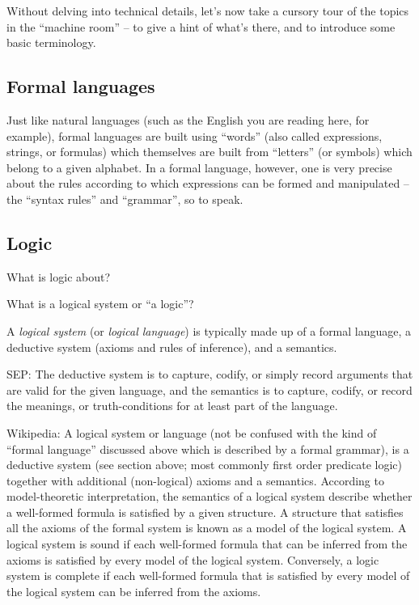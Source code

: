 Without delving into technical details, let's now take a cursory tour of the topics in the ``machine room'' -- to give a hint of what's there, and to introduce some basic terminology.

\subsection{Formal languages}

Just like natural languages (such as the English you are reading here, for example), formal languages are built using ``words'' (also called expressions, strings, or formulas) which themselves are built from ``letters'' (or symbols) which belong to a given alphabet.
In a formal language, however, one is very precise about the rules according to which expressions can be formed and manipulated -- the ``syntax rules'' and ``grammar'', so to speak.


\subsection{Logic}

What is logic about?

What is a logical system or ``a logic''?

A \emph{logical system} (or \emph{logical language}) is typically made up of a formal language, a deductive system (axioms and rules of inference), and a semantics.

SEP: The deductive system is to capture, codify, or simply record arguments that are valid for the given language, and the semantics is to capture, codify, or record the meanings, or truth-conditions for at least part of the language.

Wikipedia: A logical system or language (not be confused with the kind of ``formal language'' discussed above which is described by a formal grammar), is a deductive system (see section above; most commonly first order predicate logic) together with additional (non-logical) axioms and a semantics.
According to model-theoretic interpretation, the semantics of a logical system describe whether a well-formed formula is satisfied by a given structure.
A structure that satisfies all the axioms of the formal system is known as a model of the logical system.
A logical system is sound if each well-formed formula that can be inferred from the axioms is satisfied by every model of the logical system.
Conversely, a logic system is complete if each well-formed formula that is satisfied by every model of the logical system can be inferred from the axioms.

